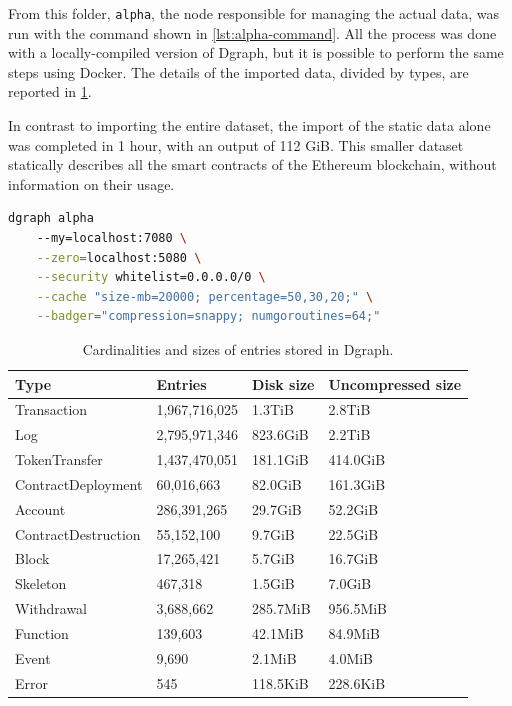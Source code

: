 From this folder, {\tt alpha}, the node responsible for managing the actual data, was run with the command shown in \cref{lst:alpha-command}. All the process was done with a locally-compiled version of Dgraph, but it is possible to perform the same steps using Docker. The details of the imported data, divided by types, are reported in \cref{table:imported-data-sizes}.

In contrast to importing the entire dataset, the import of the static data alone was completed in 1 hour, with an output of 112 GiB. This smaller dataset statically describes all the smart contracts of the Ethereum blockchain, without information on their usage. 

\begin{lstlisting}[language=Bash,caption={Command used for running the {\tt alpha} instance.},label={lst:alpha-command},captionpos=b,numbers=none]
dgraph alpha 
    --my=localhost:7080 \
    --zero=localhost:5080 \
    --security whitelist=0.0.0.0/0 \
    --cache "size-mb=20000; percentage=50,30,20;" \
    --badger="compression=snappy; numgoroutines=64;"
\end{lstlisting}

\begin{table}[H]
\centering
    \begin{threeparttable}
    \begin{tabular}{ m{3.8cm} m{3cm} m{2cm} m{4cm} } 
    \toprule
    \textbf{Type} & \textbf{Entries} & \textbf{Disk size} & \textbf{Uncompressed size} \\
    \midrule
    Transaction   & 1,967,716,025 & 1.3TiB & 2.8TiB \\ [1.2ex]
    Log   & 2,795,971,346 & 823.6GiB & 2.2TiB \\ [1.2ex]
    TokenTransfer   & 1,437,470,051 & 181.1GiB & 414.0GiB \\ [1.2ex]
    ContractDeployment   & 60,016,663 & 82.0GiB & 161.3GiB \\ [1.2ex]
    Account   & 286,391,265 & 29.7GiB & 52.2GiB \\ [1.2ex]
    ContractDestruction   & 55,152,100 & 9.7GiB & 22.5GiB \\ [1.2ex]
    Block   & 17,265,421 & 5.7GiB & 16.7GiB \\ [1.2ex]
    Skeleton   & 467,318 & 1.5GiB & 7.0GiB \\ [1.2ex]
    Withdrawal   & 3,688,662 & 285.7MiB & 956.5MiB \\ [1.2ex]
    Function   & 139,603 & 42.1MiB & 84.9MiB \\ [1.2ex]
    Event   & 9,690 & 2.1MiB & 4.0MiB \\ [1.2ex]
    Error   & 545 & 118.5KiB & 228.6KiB \\ [1.2ex]
    \bottomrule
    \end{tabular}
    \end{threeparttable}
    \caption{Cardinalities and sizes of entries stored in Dgraph\protect\footnotemark.}
    \label{table:imported-data-sizes}
\end{table}

